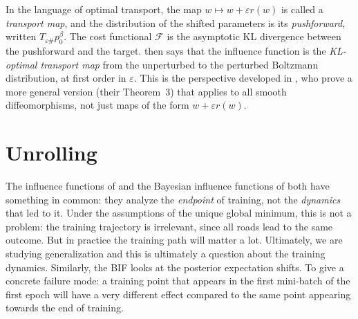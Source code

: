 \documentclass[11pt]{article}
\begin{document}
\begin{remark}\label{rem:optimal-transport}
In the language of optimal transport, the map $w\mapsto w+\varepsilon r(w)$ is called a \emph{transport map}, and the distribution of the shifted parameters is its \emph{pushforward}, written $T_{\varepsilon\#}p_0^\beta$. The cost functional $\mathcal{F}$ is the asymptotic KL divergence between the pushforward and the target.  then says that the influence function is the \emph{KL-optimal transport map} from the unperturbed to the perturbed Boltzmann distribution, at first order in $\varepsilon$. This is the perspective developed in \citet{mlodozeniec2025distributional}, who prove a more general version (their Theorem~3) that applies to all smooth diffeomorphisms, not just maps of the form $w+\varepsilon r(w)$.
\end{remark}


\section{Unrolling}\label{sec:unrolling}

The influence functions of  and the Bayesian influence functions of  both have something in common: they analyze the \emph{endpoint} of training, not the \emph{dynamics} that led to it. Under the assumptions of the unique global minimum, this is not a problem: the training trajectory is irrelevant, since all roads lead to the same outcome. But in practice the training path will matter a lot. Ultimately, we are studying generalization and this is ultimately a question about the training dynamics. Similarly, the BIF looks at the posterior expectation shifts. To give a concrete failure mode: a training point that appears in the first mini-batch of the first epoch will have a very different effect compared to the same point appearing towards the end of training.
\end{document}
